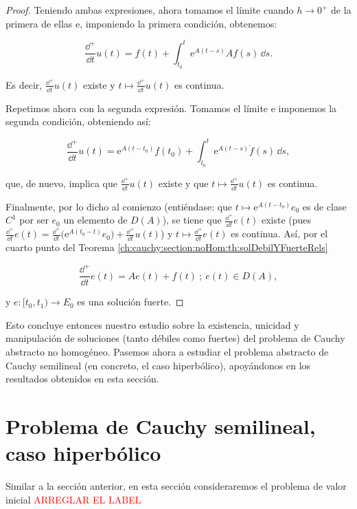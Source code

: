 \begin{proof}
    Teniendo ambas expresiones, ahora tomamos el límite cuando $h \rightarrow 0^+$ de la primera de ellas e, imponiendo la primera condición, obtenemos:

    \[\frac{\dd^+}{\dd t}u(t) = f(t) + \int_{t_0}^t \mathrm{e}^{A(t-s)}Af(s) \, \dd s.\]

    Es decir, $\displaystyle \frac{\dd^+}{\dd t}u(t)$ existe y $\displaystyle t \mapsto \frac{\dd^+}{\dd t}u(t)$ es continua.

    Repetimos ahora con la segunda expresión. Tomamos el límite e imponemos la segunda condición, obteniendo así:

    \[\frac{\dd^+}{\dd t}u(t) = \mathrm{e}^{A(t-t_0)}f(t_0) + \int_{t_0}^t \mathrm{e}^{A(t-s)}\dot{f}(s) \, \dd s,\]

    que, de nuevo, implica que $\displaystyle \frac{\dd^+}{\dd t}u(t)$ existe y que $\displaystyle t \mapsto \frac{\dd^+}{\dd t}u(t)$ es continua.

    Finalmente, por lo dicho al comienzo (entiéndase: que $t \mapsto \mathrm{e}^{A(t-t_0)}e_0$ es de clase $C^1$ por ser $e_0$ un elemento de $D(A)$), se tiene que $\displaystyle \frac{\dd^+}{\dd t}e(t)$ existe (pues $\displaystyle \frac{\dd^+}{\dd t}e(t) = \frac{\dd^+}{\dd t}\Big(\mathrm{e}^{A(t_0 - t)}e_0 \Big) + \frac{\dd^+}{\dd t}u(t)$) y $\displaystyle t \mapsto \frac{\dd^+}{\dd t}e(t)$ es continua. Así, por el cuarto punto del Teorema \eqref{ch:cauchy:section:noHom:th:solDebilYFuerteRels}

    \[\frac{\dd^+}{\dd t}e(t) = Ae(t) + f(t) \ ; \ e(t) \in D(A), \]

    y $e: [t_0, t_1) \rightarrow E_0$ es una solución fuerte.
\end{proof}

Esto concluye entonces nuestro estudio sobre la existencia, unicidad y manipulación de soluciones (tanto débiles como fuertes) del problema de Cauchy abstracto no homogéneo. Pasemos ahora a estudiar el problema abstracto de Cauchy semilineal (en concreto, el caso hiperbólico), apoyándonos en los resultados obtenidos en esta sección.

\section{Problema de Cauchy semilineal, caso hiperbólico}
\label{ch:cauchy:section:semilineal}

Similar a la sección anterior, en esta sección consideraremos el problema de valor inicial \textcolor{red}{ARREGLAR EL LABEL}


